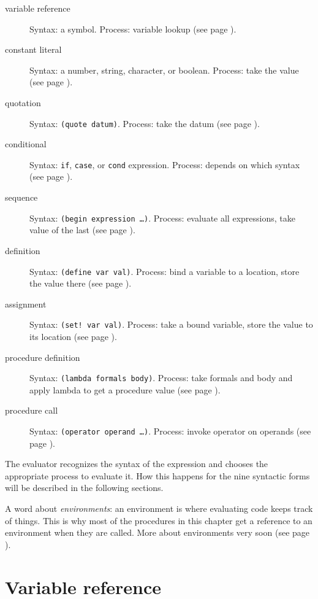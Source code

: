 \documentclass[twoside]{report}
\begin{document}
\begin{description}
\item[variable reference] Syntax: a symbol. Process: variable lookup (see page \pageref{variable-reference}).
\item[constant literal] Syntax: a number, string, character, or boolean. Process: take the value (see page \pageref{constant-literal}).
\item[quotation] Syntax: \texttt{(quote datum)}. Process: take the datum (see page \pageref{quotation}).
\item[conditional] Syntax: \texttt{if}, \texttt{case}, or \texttt{cond} expression. Process: depends on which syntax (see page \pageref{conditional}).
\item[sequence] Syntax: \texttt{(begin expression \ldots )}. Process: evaluate all expressions, take value of the last (see page \pageref{sequence}).
\item[definition] Syntax: \texttt{(define var val)}. Process: bind a variable to a location, store the value there (see page \pageref{definition}).
\item[assignment] Syntax: \texttt{(set! var val)}. Process: take a bound variable, store the value to its location (see page \pageref{assignment}).
\item[procedure definition] Syntax: \texttt{(lambda formals body)}. Process: take formals and body and apply lambda to get a procedure value (see page \pageref{procedure-definition}).
\item[procedure call] Syntax: \texttt{(operator operand \ldots )}. Process: invoke operator on operands (see page \pageref{procedure-call}).
\end{description}

The evaluator recognizes the syntax of the expression and chooses the appropriate process to evaluate it. How this happens for the nine syntactic forms will be described in the following sections.

A word about \emph{environments}: an environment is where evaluating code keeps track of things. This is why most of the procedures in this chapter get a reference to an environment when they are called. More about environments very soon (see page \pageref{environments}).

\section{Variable reference}
\label{variable-reference}
\end{document}
